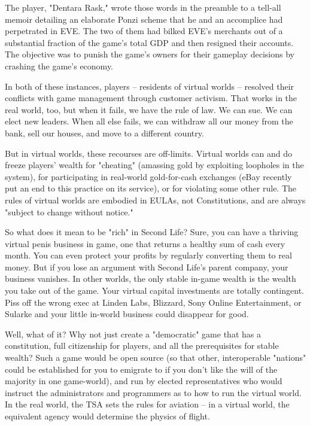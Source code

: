 The player, "Dentara Rask," wrote those words in the preamble to a
tell-all memoir detailing an elaborate Ponzi scheme that he and an
accomplice had perpetrated in EVE. The two of them had bilked EVE's
merchants out of a substantial fraction of the game's total GDP and
then resigned their accounts. The objective was to punish the
game's owners for their gameplay decisions by crashing the game's
economy.

In both of these instances, players -- residents of virtual worlds
-- resolved their conflicts with game management through customer
activism. That works in the real world, too, but when it fails, we
have the rule of law. We can sue. We can elect new leaders. When
all else fails, we can withdraw all our money from the bank, sell
our houses, and move to a different country.

But in virtual worlds, these recourses are off-limits. Virtual
worlds can and do freeze players' wealth for "cheating" (amassing
gold by exploiting loopholes in the system), for participating in
real-world gold-for-cash exchanges (eBay recently put an end to
this practice on its service), or for violating some other rule.
The rules of virtual worlds are embodied in EULAs, not
Constitutions, and are always "subject to change without notice."

So what does it mean to be "rich" in Second Life? Sure, you can
have a thriving virtual penis business in game, one that returns a
healthy sum of cash every month. You can even protect your profits
by regularly converting them to real money. But if you lose an
argument with Second Life's parent company, your business vanishes.
In other worlds, the only stable in-game wealth is the wealth you
take out of the game. Your virtual capital investments are totally
contingent. Piss off the wrong exec at Linden Labs, Blizzard, Sony
Online Entertainment, or Sularke and your little in-world business
could disappear for good.

Well, what of it? Why not just create a "democratic" game that has
a constitution, full citizenship for players, and all the
prerequisites for stable wealth? Such a game would be open source
(so that other, interoperable "nations" could be established for
you to emigrate to if you don't like the will of the majority in
one game-world), and run by elected representatives who would
instruct the administrators and programmers as to how to run the
virtual world. In the real world, the TSA sets the rules for
aviation -- in a virtual world, the equivalent agency would
determine the physics of flight.

